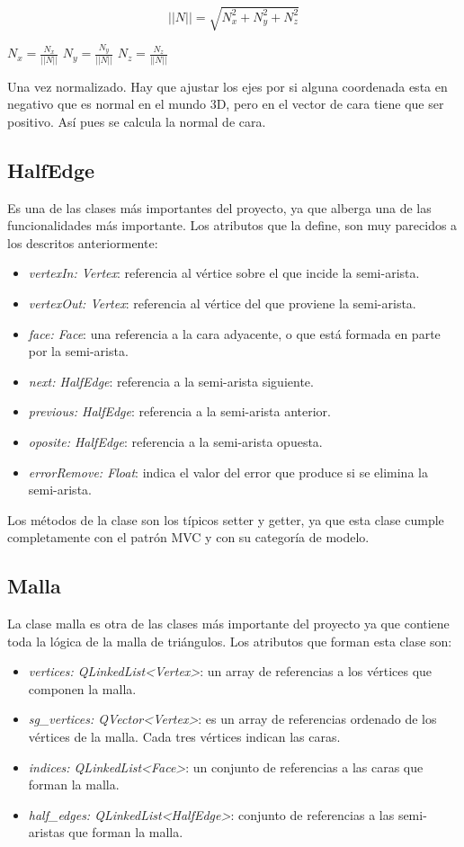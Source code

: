 $$ ||N|| = \sqrt{N_x^2 + N_y^2 + N_z^2}$$

\begin{center}
$ N_x = \frac{N_x}{||N||}$
$ N_y = \frac{N_y}{||N||}$
$ N_z = \frac{N_z}{||N||}$
\end{center}


Una vez normalizado. Hay que ajustar los ejes por si alguna coordenada esta en negativo que es normal en el mundo 3D, pero en el vector de cara tiene que ser positivo. Así pues se calcula la normal de cara.

\newpage
\subsection{ HalfEdge}
Es una de las clases más importantes del proyecto, ya que alberga una de las funcionalidades más importante. Los atributos que la define, son muy parecidos a los descritos anteriormente:

\begin{itemize}
	\item \textit{vertexIn: Vertex}: referencia al vértice sobre el que incide la semi-arista.
	\item \textit{vertexOut: Vertex}: referencia al vértice del que proviene la semi-arista.
	\item \textit{face: Face}: una referencia a la cara adyacente, o que está formada en parte por la semi-arista.
	\item \textit{next: HalfEdge}: referencia a la semi-arista siguiente.
	\item \textit{previous: HalfEdge}: referencia a la semi-arista anterior.
	\item \textit{oposite: HalfEdge}: referencia a la semi-arista opuesta.
	\item \textit{errorRemove: Float}: indica el valor del error que produce si se elimina la semi-arista.
\end{itemize}

Los métodos de la clase son los típicos setter y getter, ya que esta clase cumple completamente con el patrón MVC y con su categoría de modelo.

\subsection{ Malla}
La clase malla es otra de las clases más importante del proyecto ya que contiene toda la lógica de la malla de triángulos. Los atributos que forman esta clase son:

\begin{itemize}
	\item \textit{vertices: QLinkedList<Vertex>}: un array de referencias a los vértices que componen la malla.
	\item \textit{sg\_vertices: QVector<Vertex>}: es un array de referencias ordenado de los vértices de la malla. Cada tres vértices indican las caras.
	\item \textit{indices: QLinkedList<Face>}: un conjunto de referencias a las caras que forman la malla.
	\item \textit{half\_edges:  QLinkedList<HalfEdge>}: conjunto de referencias a las semi-aristas que forman la malla.
\end{itemize}

